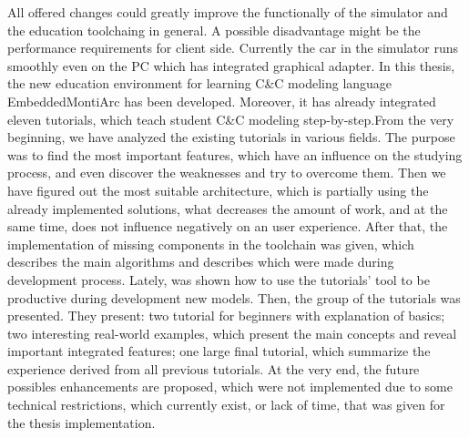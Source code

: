 All offered changes could greatly improve the functionally of the simulator and the education toolchaing in general. A possible disadvantage might be the performance requirements for client side. Currently the car in the simulator runs smoothly even on the PC which has integrated graphical adapter. \newline
\indent In this thesis, the new education environment for learning C\&C modeling language EmbeddedMontiArc has been developed. Moreover, it has already integrated eleven tutorials, which teach student C\&C modeling step-by-step.From the very beginning, we have analyzed the existing tutorials in various fields. The purpose was to find the most important features, which have an influence on the studying process, and even discover the weaknesses and try to overcome them. Then we have figured out the most suitable architecture, which is partially using the already implemented solutions, what decreases the amount of work, and at the same time, does not influence negatively on an user experience. After that, the implementation of missing components in the toolchain was given, which describes the main algorithms and describes which were made during development process. Lately, was shown how to use the tutorials' tool to be productive during development new models. Then, the group of the tutorials was presented. They present: two tutorial for beginners with explanation of basics; two interesting real-world examples, which present the main concepts and reveal important integrated features; one large final tutorial, which summarize the experience derived from all previous tutorials. At the very end, the future possibles enhancements are proposed, which were not implemented due to some technical restrictions, which currently exist, or lack of time, that was given for the thesis implementation.
\cleardoublepage
